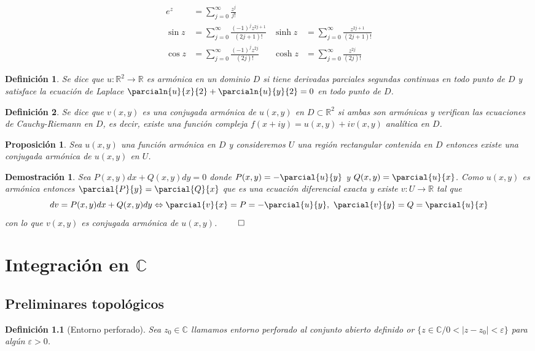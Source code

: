 \documentclass[12pt]{book}
\newtheorem{defi}{Definición}[chapter]
\newtheorem{prop}{Proposición}[chapter]
\newtheorem*{dem}{Demostración}
\newcommand{\R}{\mathbb{R}}
\newcommand{\C}{\mathbb{C}}
\begin{document}
\begin{align*}
e^z &= \sum_{j=0}^{\infty} \frac{z^j}{j!}\\
\sin z &= \sum_{j=0}^{\infty} \frac{(-1)^j z^{2j+1}}{(2j+1)!} &\sinh z &= \sum_{j=0}^{\infty} \frac{z^{2j+1}}{(2j+1)!} \\
\cos z &= \sum_{j=0}^{\infty} \frac{(-1)^j z^{2j}}{(2j)!}   &\cosh z &= \sum_{j=0}^{\infty} \frac{z^{2j}}{(2j)!}  
\end{align*}

\begin{defi}
Se dice que $u: \R^2 \longrightarrow \R$ es armónica en un dominio $D$ si tiene derivadas parciales segundas continuas en todo punto de $D$ y satisface la ecuación de Laplace $\displaystyle \parcialn{u}{x}{2} +  \parcialn{u}{y}{2} =0$ en todo punto de $D$.
\end{defi}

\begin{defi}
Se dice que $v(x,y)$ es una conjugada armónica de $u(x,y)$ en $D\subset\R^2$ si ambas son armónicas y verifican las ecuaciones de Cauchy-Riemann en $D$, es decir, existe una función compleja $f(x+iy) = u(x,y)+iv(x,y)$ analítica en $D$.
\end{defi}

\begin{prop}
Sea $u(x,y)$ una función armónica en $D$ y consideremos $U$ una región rectangular contenida en $D$ entonces existe una conjugada armónica de $u(x,y)$ en  $U$.
\end{prop}

\begin{dem}
Sea $P(x,y)dx + Q(x,y)dy =0$ donde $P(x,y)= -\parcial{u}{y}$ y $Q(x,y)= \parcial{u}{x}$. Como $u(x,y)$ es armónica entonces $\parcial{P}{y} = \parcial{Q}{x}$ que es una ecuación diferencial exacta y existe $v: U \longrightarrow \R$ tal que 
$$dv = P(x,y)dx + Q(x,y)dy \Leftrightarrow \parcial{v}{x} = P = -\parcial{u}{y},\ \parcial{v}{y} = Q = \parcial{u}{x}$$
con lo que $v(x,y)$ es conjugada armónica de $u(x,y)$. $\qed$
\end{dem}
\chapter{Integración en $\C$}
\section{Preliminares topológicos}

\begin{defi}[Entorno perforado]
Sea $z_0 \in\C$ llamamos entorno perforado al conjunto abierto definido or $\{z\in\C / 0 < |z-z_0|<\varepsilon\}$ para algún $\varepsilon>0$.
\end{defi}
\end{document}
